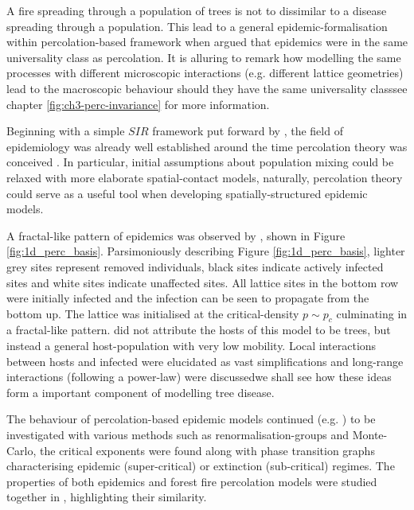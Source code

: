 A fire spreading through a population of trees is not to dissimilar to a disease spreading through a population. This lead to a general epidemic-formalisation within percolation-based framework when \cite{pub.1059067807} argued that epidemics were in the same universality class as percolation. It is alluring to remark how modelling the same processes with different microscopic interactions (e.g. different lattice geometries) lead to the macroscopic behaviour should they have the same universality class\textemdash see chapter \ref{fig:ch3-perc-invariance} for more information.

Beginning with a simple $SIR$ framework put forward by \cite{kermack-model}, the field of epidemiology was already well established around the time percolation theory was conceived \cite{baily1975mathematical}. In particular, initial assumptions about population mixing could be relaxed with more elaborate spatial-contact models, naturally, percolation theory could serve as a useful tool when developing spatially-structured epidemic models.

A fractal-like pattern of epidemics was observed by \cite{GRASSBERGER1986273}, shown in Figure \ref{fig:1d_perc_basis}. Parsimoniously describing Figure \ref{fig:1d_perc_basis}, lighter grey sites represent removed individuals, black sites indicate actively infected sites and white sites indicate unaffected sites. All lattice sites in the bottom row were initially infected and the infection can be seen to propagate from the bottom up. The lattice was initialised at the critical-density $p\sim p_c$ culminating in a fractal-like pattern. \cite{GRASSBERGER1986273} did not attribute the hosts of this model to be trees, but instead a general host-population with very low mobility. Local interactions between hosts and infected were elucidated as vast simplifications and long-range interactions (following a power-law) were discussed\textemdash we shall see how these ideas form a important component of modelling tree disease.

The behaviour of percolation-based epidemic models continued (e.g. \cite{pub.1060474189, pub.1059069981}) to be investigated with various methods such as renormalisation-groups and Monte-Carlo, the critical exponents were found along with phase transition graphs characterising epidemic (super-critical) or extinction (sub-critical) regimes. The properties of both epidemics and forest fire percolation models were studied together in \cite{pub.1052857560}, highlighting their similarity.

